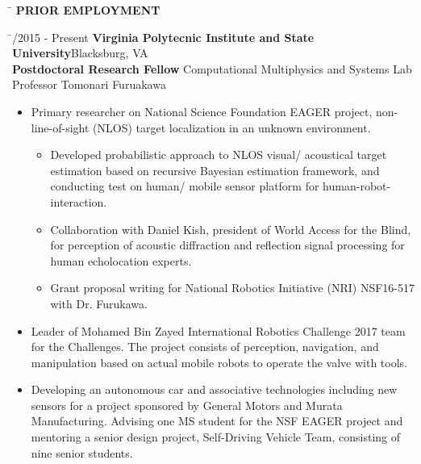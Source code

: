 \documentclass[11pt,letter]{article}
\begin{document}
\begin{tabbing}
	\hspace{2cm}\=\kill
	\>  {\bf PRIOR EMPLOYMENT}
\end{tabbing}
\begin{tabbing}
	\hspace{3cm} \= /2015 - Present \> {\bf Virginia Polytecnic Institute and State University}\hfill{Blacksburg, VA }\\
	\> {\bfseries Postdoctoral Research Fellow}	Computational Multiphysics and Systems Lab\\
	\> Professor Tomonari Furuakawa\\
\end{tabbing}
\vspace{-1cm}
			\begin{itemize}
				\item Primary researcher on National Science Foundation EAGER project, non-line-of-sight (NLOS) target localization in an unknown environment.
				\begin{itemize}
					\item Developed probabilistic approach to NLOS visual/ acoustical target estimation based on recursive Bayesian estimation framework, and conducting test on human/ mobile sensor platform for human-robot-interaction.
					\item Collaboration with Daniel Kish, president of World Access for the Blind, for perception of acoustic diffraction and reflection signal processing for human echolocation experts.
					\item Grant proposal writing for National Robotics Initiative (NRI) NSF16-517 with Dr. Furukawa.
				\end{itemize}
				\item Leader of Mohamed Bin Zayed International Robotics Challenge 2017 team for the Challenges. The project consists of perception, navigation, and manipulation based on actual mobile robots to operate the valve with tools.
				\item Developing an autonomous car and associative technologies including new sensors for a project sponsored by General Motors and Murata Manufacturing. Advising one MS student for the NSF EAGER project and mentoring a senior design project, Self-Driving Vehicle Team, consisting of nine senior students.
			\end{itemize}
\end{document}
